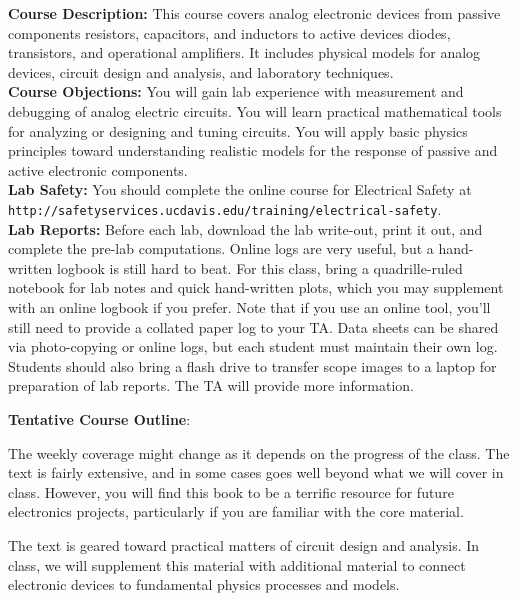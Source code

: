 \documentclass[12pt]{article}
\begin{document}
\noindent
\textbf {Course Description:}  This course covers analog electronic devices from passive components resistors, capacitors, and inductors to active devices diodes, transistors, and operational amplifiers.   It includes physical models for analog devices, circuit design and analysis, and laboratory techniques. \\

\noindent
\textbf {Course Objections:} 
You will gain  lab experience with measurement and debugging of analog electric circuits.  You will learn practical mathematical tools for analyzing or designing and tuning circuits.  You will apply basic physics principles toward understanding realistic models for the response of passive and active electronic components. \\

\noindent
\textbf {Lab Safety:} 
You should complete the online course for Electrical Safety at \\
{\tt http://safetyservices.ucdavis.edu/training/electrical-safety}.\\

\noindent
\textbf {Lab Reports:} 
Before each lab, download the lab write-out, print it out, and complete the pre-lab computations. Online logs are very useful, but a hand-written logbook is still hard to beat. For this class, bring a quadrille-ruled notebook for lab notes and quick hand-written plots, which you may supplement with an online logbook if you prefer. Note that if you use an online tool, you'll still need to provide a collated paper log to your TA. Data sheets can be shared via photo-copying or online logs, but each student must maintain their own log.  Students should also bring a flash drive to transfer scope images to a laptop for preparation of lab reports.
The TA will provide more information.


\vskip 0.5cm
\noindent
\textbf {Tentative Course Outline}:

The weekly coverage might change as it depends on the progress of the class.    The text is fairly extensive, and in some cases goes well beyond what we will cover in class.  However, you will find this book to be a terrific resource for future electronics projects, particularly if you are familiar with the core material.

The text is geared toward practical matters of circuit design and analysis.  In class, we will supplement this material with additional material to connect electronic devices to fundamental physics processes and models.
\end{document}
